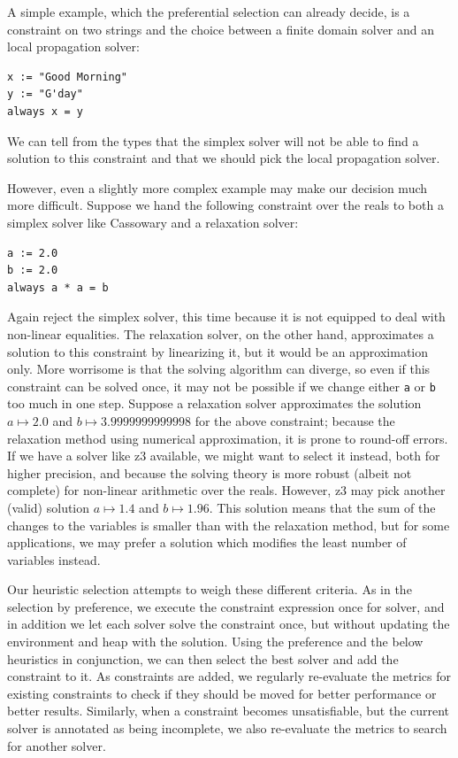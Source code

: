 A simple example, which the preferential selection can already decide, is a
constraint on two strings and the choice between a finite domain solver and an
local propagation solver:
\begin{lstlisting}
x := "Good Morning"
y := "G'day"
always x = y
\end{lstlisting}
We can tell from the types that the simplex solver will not be able to find a
solution to this constraint and that we should pick the local propagation
solver.

However, even a slightly more complex example may make our decision much more
difficult. Suppose we hand the following constraint over the reals to both a
simplex solver like Cassowary and a relaxation solver:
\begin{lstlisting}
a := 2.0
b := 2.0
always a * a = b
\end{lstlisting}
Again reject the simplex solver, this time because it is not equipped to deal
with non-linear equalities. The relaxation solver, on the other hand,
approximates a solution to this constraint by linearizing it, but it would be an
approximation only. More worrisome is that the solving algorithm can diverge, so
even if this constraint can be solved once, it may not be possible if we change
either \verb!a! or \verb!b! too much in one step. Suppose a relaxation solver
approximates the solution $a\mapsto 2.0$ and $b\mapsto 3.9999999999998$ for the
above constraint; because the relaxation method using numerical approximation,
it is prone to round-off errors. If we have a solver like \gls{z3} available, we
might want to select it instead, both for higher precision, and because the
solving theory is more robust (albeit not complete) for non-linear arithmetic
over the reals. However, \gls{z3} may pick another (valid) solution
$a\mapsto 1.4$ and $b\mapsto 1.96$. This solution means that the sum of the
changes to the variables is smaller than with the relaxation method, but for
some applications, we may prefer a solution which modifies the least number of
variables instead.

Our heuristic selection attempts to weigh these different criteria. As in the
selection by preference, we execute the constraint expression once for solver,
and in addition we let each solver solve the constraint once, but without
updating the environment and heap with the solution. Using the preference and
the below heuristics in conjunction, we can then select the best solver and add
the constraint to it. As constraints are added, we regularly re-evaluate the
metrics for existing constraints to check if they should be moved for better
performance or better results. Similarly, when a constraint becomes
unsatisfiable, but the current solver is annotated as being incomplete, we also
re-evaluate the metrics to search for another solver.

